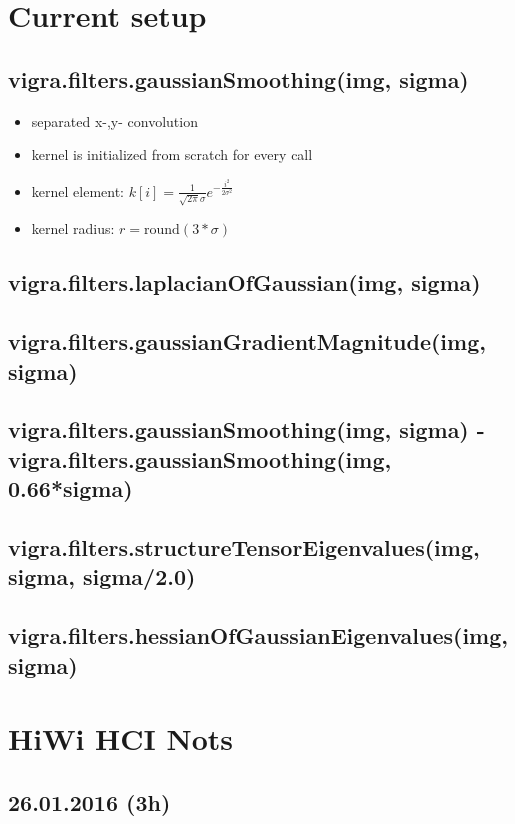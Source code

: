 \documentclass[12pt,a4paper]{article}
\begin{document}
\setlength{\parindent}{0pt}



\section{Current setup}
  \subsection{vigra.filters.gaussianSmoothing(img, sigma)}
    \begin{itemize}
      \item separated x-,y- convolution
      \item kernel is initialized from scratch for every call
      \item kernel element: $k[i] = \frac{1}{\sqrt{2\pi}\sigma} e^{-\frac{i^2}{2\sigma^2}} $
      \item kernel radius: $r = \textrm{round}(3*\sigma)$
    \end{itemize}
  \subsection{vigra.filters.laplacianOfGaussian(img, sigma)}
  \subsection{vigra.filters.gaussianGradientMagnitude(img, sigma)}
  \subsection{vigra.filters.gaussianSmoothing(img, sigma) - vigra.filters.gaussianSmoothing(img, 0.66*sigma)}
  \subsection{vigra.filters.structureTensorEigenvalues(img, sigma, sigma/2.0)}
  \subsection{vigra.filters.hessianOfGaussianEigenvalues(img, sigma)}


\section{HiWi HCI Nots}

\subsection{26.01.2016 (3h)}
\end{document}
